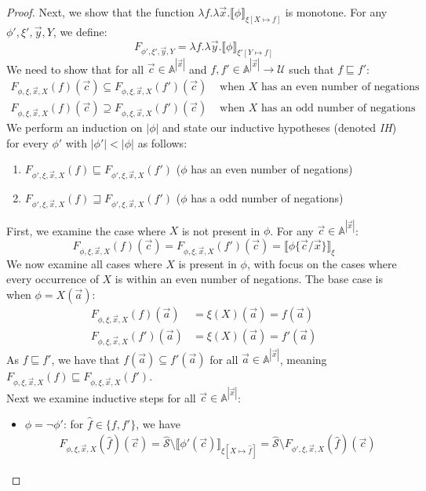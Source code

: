 \documentclass[10pt,a4paper]{article}
\theoremstyle{definition}
\theoremstyle{remark}
\newcommand\sem[2][\xi]{\llbracket#2\rrbracket_{#1}}
\newcommand\Scal{\mathcal{S}}
\newcommand\Ucal{\mathcal{U}}
\newcommand\Atoms{\mathbb{A}}
\newcommand{\F}[4][\xi]{F_{#2,#1,#3,#4}}
\newcommand\fstates[0]{\hat{\Scal}}
\begin{document}
\begin{proof}
	Next, we show that the function $\lambda f.\lambda \vec x.\sem[{\xi[X\mapsto f]}]{\phi}$ is monotone.
	For any $\phi',\xi', \vec y, Y$, we define:
	\[\F[\xi']{\phi'}{\vec y}{Y} = \lambda f.\lambda \vec y.\sem[{\xi'[Y\mapsto f]}]{\phi}\]
	 We need to show that for all $\vec c \in \Atoms^{|\vec x|}$
	and $f, f'\in \Atoms^{|\vec x|} \rightarrow \Ucal$ such that $f \sqsubseteq f'$: 
	\begin{align*}
		\F{\phi}{\vec x}{X}(f)(\vec c) \subseteq \F{\phi}{\vec x}{X}(f')(\vec c) &\text{ when $X$ has an even number of negations}\\
		\F{\phi}{\vec x}{X}(f)(\vec c) \supseteq \F{\phi}{\vec x}{X}(f')(\vec c) &\text{ when $X$ has an odd number of negations}
	\end{align*}
	We perform an induction on $|\phi|$
	and state our inductive hypotheses (denoted \textit{IH}) for every $\phi'$ with $|\phi'| < |\phi|$ as follows:
	\begin{enumerate}
		\item $\F{\phi'}{\vec x}{X}(f) \sqsubseteq \F{\phi'}{\vec x}{X}(f')$ ($\phi$ has an even
		number of negations)
		\item $\F{\phi'}{\vec x}{X}(f) \sqsupseteq \F{\phi'}{\vec x}{X}(f')$ ($\phi$ has a odd number of negations)
	\end{enumerate}
	First, we examine the case where $X$ is not present in $\phi$. For any $\vec c \in \Atoms^{|\vec x|}$:
	\[
	\F{\phi}{\vec x}{X}(f)(\vec c) = \F{\phi}{\vec x}{X}(f')(\vec c) = \sem{\phi\{\vec c / \vec x\}}
	\]
	We now examine all cases where $X$ is present in $\phi$, with focus on the cases where every occurrence of $X$ is within an even number of negations. 
	The base case is when $\phi = X(\vec a)$:
	\begin{align*}
		\F{\phi}{\vec x}{X}(f)(\vec a) &= \xi(X)(\vec a) = f(\vec a)\\
		\F{\phi}{\vec x}{X}(f')(\vec a) &= \xi(X)(\vec a) = f'(\vec a)
	\end{align*}
	As $f\sqsubseteq f'$, we have that $f(\vec a) \subseteq f'(\vec a)$ for all $\vec a \in \Atoms^{|\vec x|}$, 
	meaning $\F{\phi}{\vec x}{X}(f) \sqsubseteq \F{\phi}{\vec x}{X}(f')$.\\
	Next we examine inductive steps for all $\vec c \in \Atoms^{|\vec x|}$:
	\begin{itemize}
		\item $\phi = \lnot \phi'$: for $\hat f \in \{f, f'\}$, we have
		\begin{align*}
			&\F{\phi}{\vec x}{X}(\hat  f)(\vec c)  = \fstates \setminus \sem[{\xi[X \mapsto \hat f]}]{\phi'(\vec c)} =  \fstates \setminus \F{\phi'}{\vec x}{X}(\hat f)(\vec c)

\end{align*}
\end{itemize}
\end{proof}
\end{document}
